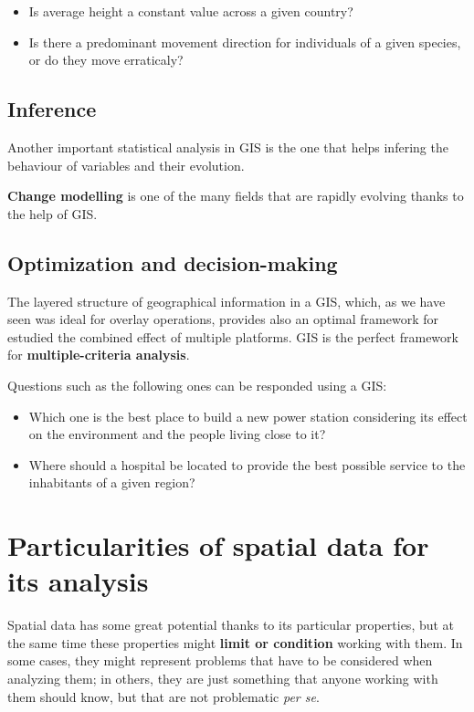 \begin{itemize}
\item Is average height a constant value across a given country?

\item Is there a predominant movement direction for individuals of a given species, or do they move erraticaly?
\end{itemize}

\subsection{Inference}

Another important statistical analysis in GIS is the one that helps infering the behaviour of variables and their evolution.

\textbf{Change modelling} is one of the many fields that are rapidly evolving thanks to the help of GIS.

\subsection{Optimization and decision-making}

The layered structure of geographical information in a GIS, which, as we have seen was ideal for overlay operations, provides also an optimal framework for estudied the combined effect of multiple platforms. GIS is the perfect framework for \textbf{multiple-criteria analysis}.

Questions such as the following ones can be responded using a GIS:

\begin{itemize}
\item Which one is the best place to build a new power station considering its effect on the environment and the people living close to it?

\item Where should a hospital be located to provide the best possible service to the inhabitants of a given region?
\end{itemize}


\section{Particularities of spatial data for its analysis}

Spatial data has some great potential thanks to its particular properties, but at the same time these properties might \textbf{limit or condition} working with them. In some cases, they might represent problems that have to be considered when analyzing them; in others, they are just something that anyone working with them should know, but that are not problematic \emph{per se}.

